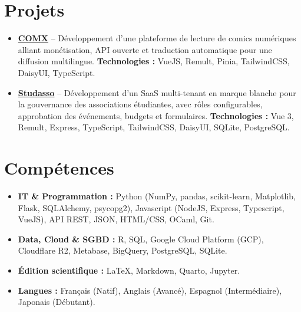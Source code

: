\documentclass[11pt,a4paper]{article}
\begin{document}
\section*{Projets}
\begin{itemize}[leftmargin=0.4cm, itemsep=2pt]
    \item \textbf{\href{https://comx.click/}{COMX}} -- Développement d'une plateforme de lecture de comics numériques alliant monétisation, API ouverte et traduction automatique pour une diffusion multilingue.
    \textbf{Technologies :} VueJS, Remult, Pinia, TailwindCSS, DaisyUI, TypeScript.
    \item \textbf{\href{https://studasso.fr/home}{Studasso}} -- Développement d'un SaaS multi-tenant en marque blanche pour la gouvernance des associations étudiantes, avec rôles configurables, approbation des événements, budgets et formulaires.
    \textbf{Technologies :} Vue 3, Remult, Express, TypeScript, TailwindCSS, DaisyUI, SQLite, PostgreSQL. 
\end{itemize}

\section*{Compétences}
\begin{itemize}[leftmargin=0.4cm, itemsep=1pt]
    \item \textbf{IT \& Programmation :} Python (NumPy, pandas, scikit-learn, Matplotlib, Flask, SQLAlchemy, psycopg2), Javascript (NodeJS, Express, Typescript, VueJS), API REST, JSON, HTML/CSS, OCaml, Git.
    \item \textbf{Data, Cloud \& SGBD :} R, SQL, Google Cloud Platform (GCP), Cloudflare R2, Metabase, BigQuery, PostgreSQL, SQLite.
    \item \textbf{Édition scientifique :} \LaTeX, Markdown, Quarto, Jupyter.
    \item \textbf{Langues :} Français (Natif), Anglais (Avancé), Espagnol (Intermédiaire), Japonais (Débutant).
\end{itemize}
\end{document}
